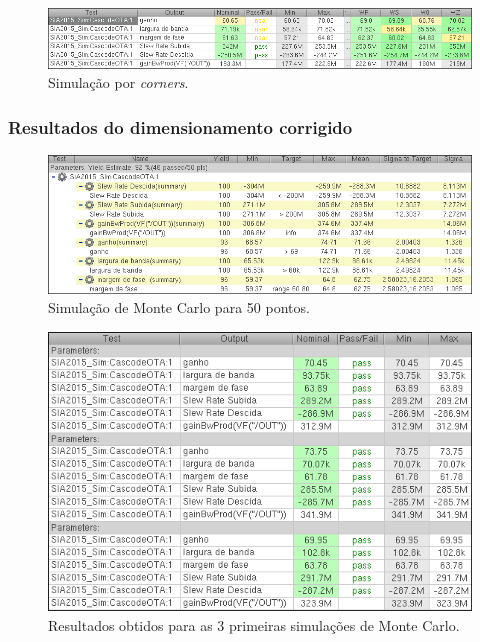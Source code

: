 \documentclass[11pt]{article}
\numberwithin{equation}{section}
\begin{document}
\begin{figure}[H]
	\centering
	\includegraphics[keepaspectratio=true, scale=0.65]{exps/Corners_Antigo}
	\vspace{-0.5em}
	\caption{Simulação por \textit{corners}.}
	\vspace{-0.8em}
\end{figure} 

\subsubsection{Resultados do dimensionamento corrigido} 

\begin{figure}[H]
	\centering
	\includegraphics[keepaspectratio=true, scale=0.65]{exps/MonteCarlo_50pt_Novo}
	\vspace{-0.5em}
	\caption{Simulação de Monte Carlo para 50 pontos.}
	\vspace{-0.8em}
\end{figure} 

\begin{figure}[H]
	\centering
	\includegraphics[keepaspectratio=true, scale=0.65]{exps/MonteCarlo_3pt_Novo}
	\vspace{-0.5em}
	\caption{Resultados obtidos para as 3 primeiras simulações de Monte Carlo.}
	\vspace{-0.8em}
\end{figure} 
\end{document}
